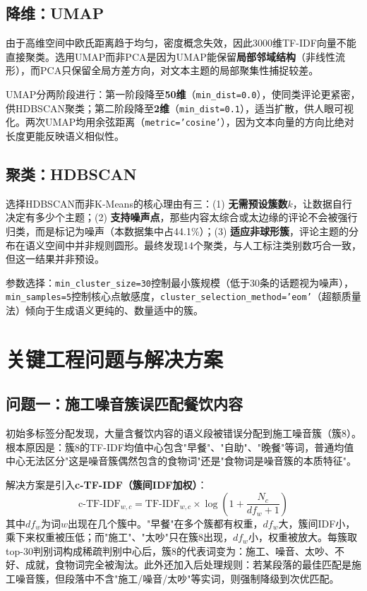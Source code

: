 \documentclass[11pt, a4paper]{article}
\begin{document}
\subsection{降维：UMAP}

由于高维空间中欧氏距离趋于均匀，密度概念失效，因此3000维TF-IDF向量不能直接聚类。选用UMAP而非PCA是因为UMAP能保留\textbf{局部邻域结构}（非线性流形），而PCA只保留全局方差方向，对文本主题的局部聚集性捕捉较差。

UMAP分两阶段进行：第一阶段降至\textbf{50维}（\texttt{min\_dist=0.0}），使同类评论更紧密，供HDBSCAN聚类；第二阶段降至\textbf{2维}（\texttt{min\_dist=0.1}），适当扩散，供人眼可视化。两次UMAP均用余弦距离（\texttt{metric='cosine'}），因为文本向量的方向比绝对长度更能反映语义相似性。

\subsection{聚类：HDBSCAN}

选择HDBSCAN而非K-Means的核心理由有三：(1) \textbf{无需预设簇数}$k$，让数据自行决定有多少个主题；(2) \textbf{支持噪声点}，那些内容太综合或太边缘的评论不会被强行归类，而是标记为噪声（本数据集中占44.1\%）；(3) \textbf{适应非球形簇}，评论主题的分布在语义空间中并非规则圆形。最终发现14个聚类，与人工标注类别数巧合一致，但这一结果并非预设。

参数选择：\texttt{min\_cluster\_size=30}控制最小簇规模（低于30条的话题视为噪声），\texttt{min\_samples=5}控制核心点敏感度，\texttt{cluster\_selection\_method='eom'}（超额质量法）倾向于生成语义更纯的、数量适中的簇。

\section{关键工程问题与解决方案}

\subsection{问题一：施工噪音簇误匹配餐饮内容}

初始多标签分配发现，大量含餐饮内容的语义段被错误分配到施工噪音簇（簇8）。根本原因是：簇8的TF-IDF均值中心包含"早餐"、"自助"、"晚餐"等词，普通均值中心无法区分"这是噪音簇偶然包含的食物词"还是"食物词是噪音簇的本质特征"。

解决方案是引入\textbf{c-TF-IDF（簇间IDF加权）}：
$$
\text{c-TF-IDF}_{w,c} = \text{TF-IDF}_{w,c} \times \log\!\left(1 + \frac{N_c}{df_w + 1}\right)
$$
其中$df_w$为词$w$出现在几个簇中。"早餐"在多个簇都有权重，$df_w$大，簇间IDF小，乘下来权重被压低；而"施工"、"太吵"只在簇8出现，$df_w$小，权重被放大。每簇取top-30判别词构成稀疏判别中心后，簇8的代表词变为：施工、噪音、太吵、不好、成就，食物词完全被淘汰。此外还加入后处理规则：若某段落的最佳匹配是施工噪音簇，但段落中不含"施工/噪音/太吵"等实词，则强制降级到次优匹配。
\end{document}
